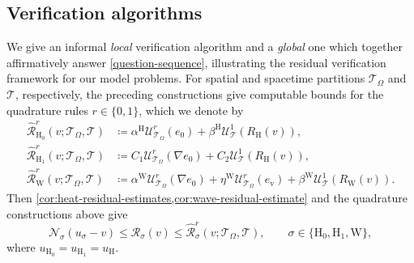 \subsection{Verification algorithms}
\label{subsec:verification-algorithms}

We give an informal \emph{local} verification algorithm and a \emph{global} one
which together affirmatively answer \cref{question-sequence}, illustrating the residual verification framework for our model problems.
For spatial and spacetime partitions $\mathcal T_\Omega$ and $\mathcal T$,
respectively, the preceding constructions give computable bounds for the quadrature rules $r\in\{0,1\}$, which we denote by
\begin{equation}\label{eq:computable-residual-bounds}
\begin{aligned}
    \widehat{\mathcal R}_{\mathrm H_0}^{r}
    (v;\mathcal T_\Omega,\mathcal T)
    &\coloneqq
    \alpha^{\mathrm H}\mathcal U_{\mathcal T_\Omega}^r(e_0)
    +\beta^{\mathrm H}\mathcal U_{\mathcal T}^1(R_{\mathrm H}(v)),
    \\
    \widehat{\mathcal R}_{\mathrm H_1}^{r}
    (v;\mathcal T_\Omega,\mathcal T)
    &\coloneqq
    C_1\mathcal U_{\mathcal T_\Omega}^r(\nabla e_0)
    +C_2\mathcal U_{\mathcal T}^1(R_{\mathrm H}(v)),    \\
    \widehat{\mathcal R}_{\mathrm W}^r
    (v;\mathcal T_\Omega,\mathcal T)
    &\coloneqq
    \alpha^{\mathrm W}\mathcal U_{\mathcal T_\Omega}^r(\nabla e_0)
    +\eta^{\mathrm W}\mathcal U_{\mathcal T_\Omega}^r(e_{\mathrm v})
    +\beta^{\mathrm W}\mathcal U_{\mathcal T}^1
        (R_{\mathrm W}(v)). 
\end{aligned}
\end{equation}
Then
\cref{cor:heat-residual-estimates,cor:wave-residual-estimate} and the
quadrature constructions above give
\begin{equation}\label{eq:residual-bound-chain}
    \mathcal N_\sigma(u_\sigma-v)
    \leq \mathcal R_\sigma(v)
    \leq \widehat{\mathcal R}_\sigma^r
    (v;\mathcal T_\Omega,\mathcal T), \qquad \sigma\in\{\mathrm H_0,\mathrm H_1,\mathrm W\},
\end{equation}
where $u_{\mathrm H_0}=u_{\mathrm H_1}=u_{\mathrm H}$.

